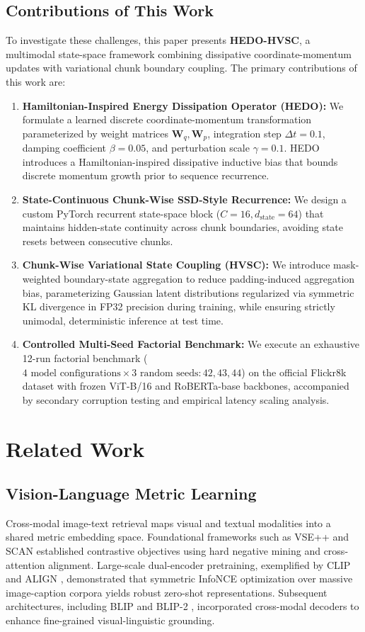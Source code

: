 \documentclass[journal]{IEEEtran}
\begin{document}
\subsection{Contributions of This Work}
To investigate these challenges, this paper presents \textbf{HEDO-HVSC}, a multimodal state-space framework combining dissipative coordinate-momentum updates with variational chunk boundary coupling. The primary contributions of this work are:
\begin{enumerate}
    \item \textbf{Hamiltonian-Inspired Energy Dissipation Operator (HEDO):} We formulate a learned discrete coordinate-momentum transformation parameterized by weight matrices $\mathbf{W}_q, \mathbf{W}_p$, integration step $\Delta t=0.1$, damping coefficient $\beta=0.05$, and perturbation scale $\gamma=0.1$. HEDO introduces a Hamiltonian-inspired dissipative inductive bias that bounds discrete momentum growth prior to sequence recurrence.
    \item \textbf{State-Continuous Chunk-Wise SSD-Style Recurrence:} We design a custom PyTorch recurrent state-space block ($C=16, d_{\text{state}}=64$) that maintains hidden-state continuity across chunk boundaries, avoiding state resets between consecutive chunks.
    \item \textbf{Chunk-Wise Variational State Coupling (HVSC):} We introduce mask-weighted boundary-state aggregation to reduce padding-induced aggregation bias, parameterizing Gaussian latent distributions regularized via symmetric KL divergence in FP32 precision during training, while ensuring strictly unimodal, deterministic inference at test time.
    \item \textbf{Controlled Multi-Seed Factorial Benchmark:} We execute an exhaustive 12-run factorial benchmark ($4\text{ model configurations} \times 3\text{ random seeds}: 42, 43, 44$) on the official Flickr8k dataset with frozen ViT-B/16 and RoBERTa-base backbones, accompanied by secondary corruption testing and empirical latency scaling analysis.
\end{enumerate}

\section{Related Work}
\label{sec:related_work}

\subsection{Vision-Language Metric Learning}
Cross-modal image-text retrieval maps visual and textual modalities into a shared metric embedding space. Foundational frameworks such as VSE++ \cite{faghri2017vse++} and SCAN \cite{lee2018stacked} established contrastive objectives using hard negative mining and cross-attention alignment. Large-scale dual-encoder pretraining, exemplified by CLIP \cite{radford2021learning} and ALIGN \cite{jia2021scaling}, demonstrated that symmetric InfoNCE optimization over massive image-caption corpora yields robust zero-shot representations. Subsequent architectures, including BLIP \cite{li2022blip} and BLIP-2 \cite{li2023blip2}, incorporated cross-modal decoders to enhance fine-grained visual-linguistic grounding.
\end{document}
